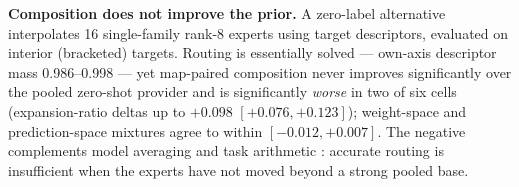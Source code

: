 \documentclass[11pt,letterpaper]{article}
\begin{document}
\textbf{Composition does not improve the prior.} A zero-label alternative interpolates 16 single-family rank-8 experts using target descriptors, evaluated on interior (bracketed) targets. Routing is essentially solved --- own-axis descriptor mass 0.986--0.998 --- yet map-paired composition never improves significantly over the pooled zero-shot provider and is significantly \emph{worse} in two of six cells (expansion-ratio deltas up to $+0.098$ $[+0.076,+0.123]$); weight-space and prediction-space mixtures agree to within $[-0.012,+0.007]$. The negative complements model averaging and task arithmetic \citep{wortsman2022soups,ilharco2022task}: accurate routing is insufficient when the experts have not moved beyond a strong pooled base.



\end{document}
